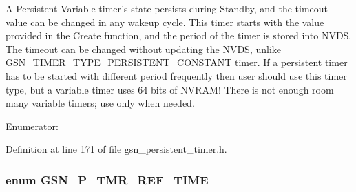 A Persistent Variable timer's state persists during Standby, and the timeout value can be changed in any wakeup cycle. This timer starts with the value provided in the Create function, and the period of the timer is stored into NVDS. The timeout can be changed without updating the NVDS, unlike GSN\_\-TIMER\_\-TYPE\_\-PERSISTENT\_\-CONSTANT timer. If a persistent timer has to be started with different period frequently then user should use this timer type, but a variable timer uses 64 bits of NVRAM! There is not enough room many variable timers; use only when needed. \begin{Desc}
\item[Enumerator: ]\par
\begin{description}
\item[{\em 
\hypertarget{a00671_ggadc3540874fb3842b2eb56edd0c82945bac4338c7c860b0a33c9371d86d41b87c8}{
GSN\_\-TIMER\_\-TYPE\_\-PERSISTENT\_\-CONSTANT}
\label{a00671_ggadc3540874fb3842b2eb56edd0c82945bac4338c7c860b0a33c9371d86d41b87c8}
}]\item[{\em 
\hypertarget{a00671_ggadc3540874fb3842b2eb56edd0c82945bae46518ab7c9f147305e08200cf63b9ed}{
GSN\_\-TIMER\_\-TYPE\_\-PERSISTENT\_\-VARIABLE}
\label{a00671_ggadc3540874fb3842b2eb56edd0c82945bae46518ab7c9f147305e08200cf63b9ed}
}]\end{description}
\end{Desc}



Definition at line 171 of file gsn\_\-persistent\_\-timer.h.

\hypertarget{a00671_ga9aa5599a087c6080868052f86ecad7df}{
\subsubsection[{GSN\_\-P\_\-TMR\_\-REF\_\-TIME}]{\setlength{\rightskip}{0pt plus 5cm}enum {\bf GSN\_\-P\_\-TMR\_\-REF\_\-TIME}}}
\label{a00671_ga9aa5599a087c6080868052f86ecad7df}


